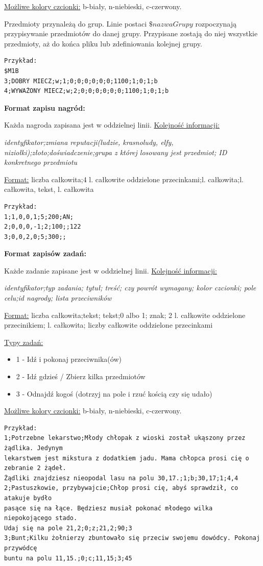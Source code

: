 \documentclass[a4paper, 11pt]{article}
\begin{document}
\underline{Możliwe kolory czcionki:} b-biały, n-niebieski, c-czerwony.

Przedmioty przynależą do grup. Linie postaci $ \$nazwaGrupy $ rozpoczynają przypisywanie przedmiotów do danej grupy. Przypisane zostają do niej wszystkie przedmioty, aż do końca pliku lub zdefiniowania kolejnej grupy.
\begin{verbatim}
Przykład:
$M1B
3;DOBRY MIECZ;w;1;0;0;0;0;0;0;1100;1;0;1;b
4;WYWAŻONY MIECZ;w;2;0;0;0;0;0;0;1100;1;0;1;b
\end{verbatim}
\textbf{Format zapisu nagród:}

Każda nagroda zapisana jest w oddzielnej linii. \underline{Kolejność informacji:}

\textit{identyfikator;zmiana reputacji(ludzie, krasnoludy, elfy, niziołki);złoto;doświadczenie;grupa z której losowany jest przedmiot; ID konkretnego przedmiotu}

\underline{Format:}
liczba całkowita;4 l. całkowite oddzielone przecinkami;l. całkowita;l. całkowita, tekst, l. całkowita
\begin{verbatim}
Przykład:
1;1,0,0,1;5;200;AN;
2;0,0,0,-1;2;100;;122
3;0,0,2,0;5;300;;
\end{verbatim}

\noindent\textbf{Format zapisów zadań:}

Każde zadanie zapisane jest w oddzielnej linii. \underline{Kolejność informacji:}

\textit{identyfikator;typ zadania; tytuł; treść; czy powrót wymagany; kolor czcionki; pole celu;id nagrody; lista przeciwników}

\underline{Format:}
liczba całkowita;tekst; tekst;0 albo 1; znak; 2 l. całkowite oddzielone przecinikiem; l. całkowita; liczby całkowite oddzielone przecinkami

\underline{Typy zadań:} 
\begin{itemize}
	\item 1 - Idź i pokonaj przeciwnika(ów)
	\item 2 - Idź gdzieś / Zbierz kilka przedmiotów
	\item 3 - Odnajdź kogoś (dotrzyj na pole i rzuć kością czy się udało)
\end{itemize}

\underline{Możliwe kolory czcionki:} b-biały, n-niebieski, c-czerwony.

\begin{verbatim}
Przykład:
1;Potrzebne lekarstwo;Młody chłopak z wioski został ukąszony przez żądlika. Jedynym
lekarstwem jest mikstura z dodatkiem jadu. Mama chłopca prosi cię o zebranie 2 żądeł.
Żądliki znajdziesz nieopodal lasu na polu 30,17.;1;b;30,17;1;4,4
2;Pastuszkowie, przybywajcie;Chłop prosi cię, abyś sprawdził, co atakuje bydło
pasące się na łące. Będziesz musiał pokonać młodego wilka niepokojącego stado.
Udaj się na pole 21,2;0;z;21,2;90;3
3;Bunt;Kilku żołnierzy zbuntowało się przeciw swojemu dowódcy. Pokonaj przywódcę
buntu na polu 11,15.;0;c;11,15;3;45
\end{verbatim}
\end{document}
